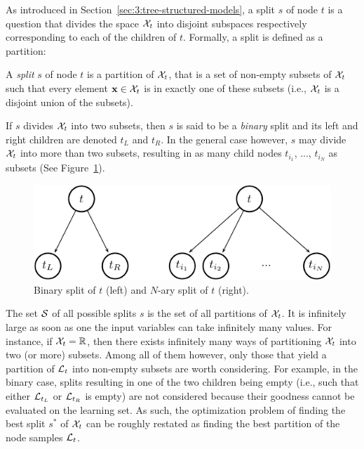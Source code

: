 As introduced in Section~\ref{sec:3:tree-structured-models}, a
split $s$ of node $t$ is  a question that divides the space ${\cal X}_t$ into
disjoint subspaces respectively  corresponding to each of the children of $t$.
Formally, a split is defined as a partition:

\begin{definition}
A \emph{split} $s$ of node $t$ is a partition of ${\cal X}_t$, that is a set of
non-empty subsets of ${\cal X}_t$ such that every element $\mathbf{x} \in {\cal X}_t$
is in exactly one of these subsets (i.e., ${\cal X}_t$ is a disjoint union
of the subsets).
\end{definition}

If $s$ divides ${\cal X}_t$ into two subsets, then $s$ is said to be a
\textit{binary} split and its left and right children are denoted $t_L$ and
$t_R$. In the general case however, $s$ may divide ${\cal X}_t$ into more than
two subsets, resulting in as many child nodes $t_{i_1}$, ..., $t_{i_N}$ as
subsets (See Figure~\ref{fig:3:splits}).

\begin{figure}[b]
    \centering
    \includegraphics[scale=1.0]{figures/ch3_splits.pdf}
    \caption{Binary split of $t$ (left) and $N$-ary split of $t$ (right).}
    \label{fig:3:splits}
\end{figure}

The set ${\cal S}$ of all possible splits $s$ is the set of all partitions of
${\cal X}_t$. It is infinitely large as soon as one the input variables can
take infinitely many values. For instance, if ${\cal X}_t = \mathbb{R}$, then
there exists infinitely many ways of partitioning ${\cal X}_t$ into two (or
more) subsets. Among all of them however, only those that yield a partition of
${\cal L}_t$ into non-empty subsets are worth considering. For example, in the
binary case, splits resulting in one of the two children being empty (i.e., such
that either ${\cal L}_{t_L}$ or ${\cal L}_{t_R}$ is empty) are not considered
because their goodness cannot be evaluated on the learning set. As such, the
optimization problem of finding the best split $s^*$ of ${\cal X}_t$ can be
roughly restated as finding the best partition of the node samples ${\cal L}_t$.

